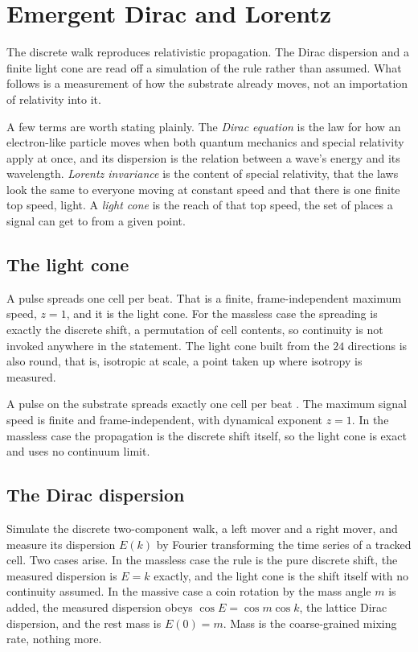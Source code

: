 \section{Emergent Dirac and Lorentz}

The discrete walk reproduces relativistic propagation. The Dirac dispersion and a finite light cone are read off
a simulation of the rule rather than assumed. What follows is a measurement of how the substrate already moves,
not an importation of relativity into it.

A few terms are worth stating plainly. The \emph{Dirac equation} is the law for how an electron-like particle
moves when both quantum mechanics and special relativity apply at once, and its dispersion is the relation
between a wave's energy and its wavelength. \emph{Lorentz invariance} is the content of special relativity, that
the laws look the same to everyone moving at constant speed and that there is one finite top speed, light. A
\emph{light cone} is the reach of that top speed, the set of places a signal can get to from a given point.

\subsection{The light cone}

A pulse spreads one cell per beat. That is a finite, frame-independent maximum speed, $z = 1$, and it is the
light cone. For the massless case the spreading is exactly the discrete shift, a permutation of cell contents,
so continuity is not invoked anywhere in the statement. The light cone built from the $24$ directions is also
round, that is, isotropic at scale, a point taken up where isotropy is measured.

\begin{result}
A pulse on the substrate spreads exactly one cell per beat \cite{pollard2026vibetest}. The maximum signal speed
is finite and frame-independent, with dynamical exponent $z = 1$. In the massless case the propagation is the
discrete shift itself, so the light cone is exact and uses no continuum limit.
\end{result}

\subsection{The Dirac dispersion}

Simulate the discrete two-component walk, a left mover and a right mover, and measure its dispersion $E(k)$ by
Fourier transforming the time series of a tracked cell. Two cases arise. In the massless case the rule is the
pure discrete shift, the measured dispersion is $E = k$ exactly, and the light cone is the shift itself with no
continuity assumed. In the massive case a coin rotation by the mass angle $m$ is added, the measured dispersion
obeys $\cos E = \cos m \cos k$, the lattice Dirac dispersion, and the rest mass is $E(0) = m$. Mass is the
coarse-grained mixing rate, nothing more.

